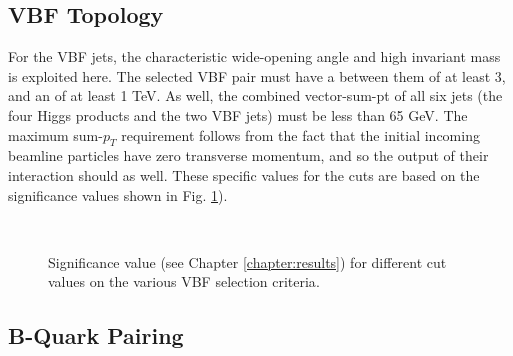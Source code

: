     \subsection{VBF Topology}

        For the VBF jets, the characteristic wide-opening angle and high invariant mass is exploited here.
        The selected VBF pair must have a \deta between them of at least 3,
            and an \mjj of at least 1 TeV.
        As well, the combined vector-sum-pt of all six jets
            (the four Higgs products and the two VBF jets)
            must be less than 65 GeV.
        The maximum sum-$p_T$ requirement follows from the fact that the initial incoming beamline particles have
            zero transverse momentum, and so the output of their interaction should as well.
        These specific values for the cuts are based on the significance values shown in Fig. \ref{fig:vbf_cuts}).

        \begin{figure}[tbh]
            \\
            \caption{
                Significance value (see Chapter \ref{chapter:results})
                    for different cut values on the various VBF selection criteria\cite{vbf_hh_4b_2018_int}.
            }
            \label{fig:vbf_cuts}
        \end{figure}
        \FloatBarrier


    \subsection{B-Quark Pairing}

